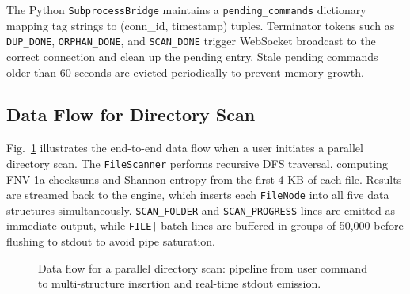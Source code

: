 \documentclass[conference]{IEEEtran}
\begin{document}
The Python \texttt{SubprocessBridge} maintains a \texttt{pending\_commands} dictionary mapping tag strings to (conn\_id, timestamp) tuples. Terminator tokens such as \texttt{DUP\_DONE}, \texttt{ORPHAN\_DONE}, and \texttt{SCAN\_DONE} trigger WebSocket broadcast to the correct connection and clean up the pending entry. Stale pending commands older than 60 seconds are evicted periodically to prevent memory growth.

\subsection{Data Flow for Directory Scan}

Fig.~\ref{fig:scan_flow} illustrates the end-to-end data flow when a user initiates a parallel directory scan. The \texttt{FileScanner} performs recursive DFS traversal, computing FNV-1a checksums and Shannon entropy from the first 4 KB of each file. Results are streamed back to the engine, which inserts each \texttt{FileNode} into all five data structures simultaneously. \texttt{SCAN\_FOLDER} and \texttt{SCAN\_PROGRESS} lines are emitted as immediate output, while \texttt{FILE|} batch lines are buffered in groups of 50{,}000 before flushing to stdout to avoid pipe saturation.

\begin{figure}[htbp]
\centering
{}
\caption{Data flow for a parallel directory scan: pipeline from user command to multi-structure insertion and real-time stdout emission.}
\label{fig:scan_flow}
\end{figure}
\end{document}
